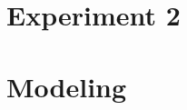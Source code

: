 \documentclass{article}
\begin{document}
\section{Experiment 2}\label{sec:}

\section{Modeling}\label{sec:}




%
%
%
%
\end{document}
